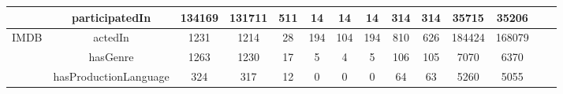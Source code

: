 \begin{tabular}{|c|c|c|c|c|c|c|c|c|c|c|c|c|c|}
 &     participatedIn       &  134169      &     131711     &      511        &  14  &        14        &  14      &    314   &   314   &     35715          &    35206            &              &              
  \\ \hline
\multirow{3}{*}{IMDB} &     actedIn       &    1231    &    1214      &   28    &   194    &    104   &   194                  &    810   &   626   &    184424           &    168079            &              &               \\ \cline{2-14}
  &     hasGenre       &    1263    &     1230     &      17        & 5 &          4        &    5    &   106    &   105   &   7070            &    6370            &              &               \\ \cline{2-14}
 &     hasProductionLanguage       &   324     &     317     &      12        & 0  &         0        &   0     &   64    &   63   &  5260             &    5055            &              &               \\ \cline{1-14}
\end{tabular}

